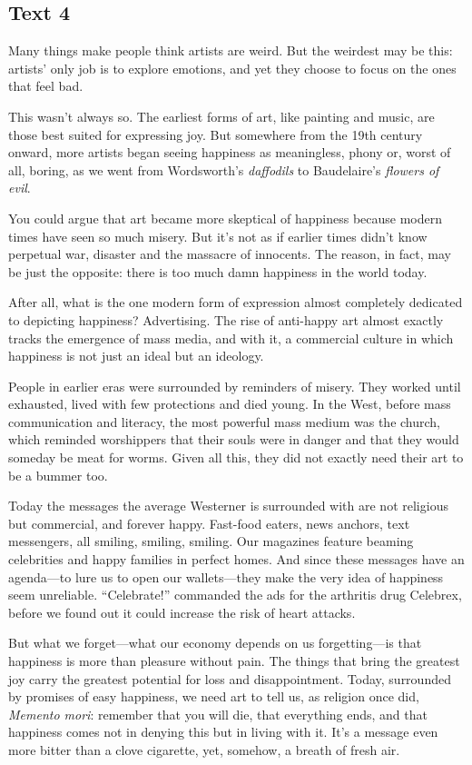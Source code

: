 \newpage
\subsection{Text 4}


Many things make people think artists are weird. But the weirdest may be
this: artists' only job is to explore emotions, and yet they choose to
focus on the ones that feel bad.

This wasn't always so. The earliest forms of art, like painting and
music, are those best suited for expressing joy. But somewhere from the
19th century onward, more artists began seeing happiness as meaningless,
phony or, worst of all, boring, as we went from Wordsworth's \emph{daffodils}
to Baudelaire's \emph{flowers of evil}.

You could argue that art became more skeptical of happiness because
modern times have seen so much misery. But it's not as if earlier times
didn't know perpetual war, disaster and the massacre of innocents. The
reason, in fact, may be just the opposite: there is too much damn
happiness in the world today.

After all, what is the one modern form of expression almost completely
dedicated to depicting happiness? Advertising. The rise of anti-happy
art almost exactly tracks the emergence of mass media, and with it, a
commercial culture in which happiness is not just an ideal but an
ideology.

People in earlier eras were surrounded by reminders of misery. They
worked until exhausted, lived with few protections and died young. In
the West, before mass communication and literacy, the most powerful mass
medium was the church, which reminded worshippers that their souls were
in danger and that they would someday be meat for worms. Given all this,
they did not exactly need their art to be a bummer too.

Today the messages the average Westerner is surrounded with are not
religious but commercial, and forever happy. Fast-food eaters, news
anchors, text messengers, all smiling, smiling, smiling. Our magazines
feature beaming celebrities and happy families in perfect homes. And
since these messages have an agenda---to lure us to open our
wallets---they make the very idea of happiness seem unreliable.
``Celebrate!'' commanded the ads for the arthritis drug Celebrex, before
we found out it could increase the risk of heart attacks.

But what we forget---what our economy depends on us forgetting---is that
happiness is more than pleasure without pain. The things that bring the
greatest joy carry the greatest potential for loss and disappointment.
Today, surrounded by promises of easy happiness, we need art to tell us,
as religion once did, \emph{Memento mori}: remember that you will die,
that everything ends, and that happiness comes not in denying this but
in living with it. It's a message even more bitter than a clove
cigarette, yet, somehow, a breath of fresh air.



